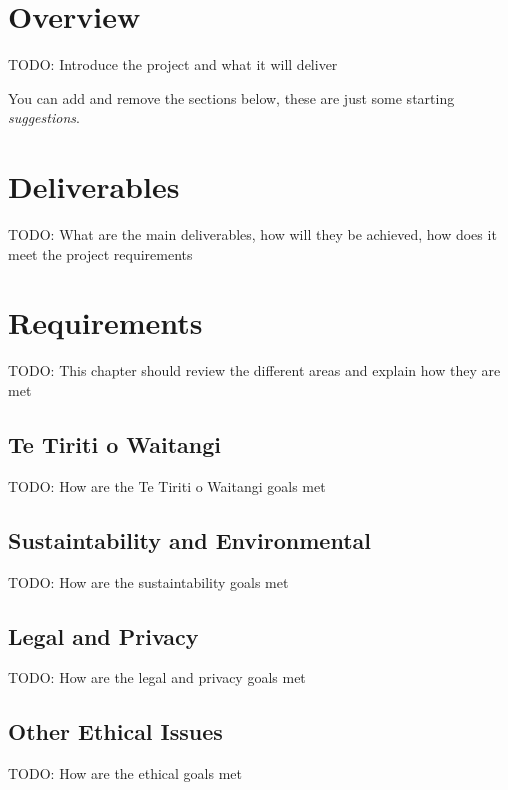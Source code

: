 
\chapter{Overview}

TODO: Introduce the project and what it will deliver

You can add and remove the sections below, these are just some starting \textit{suggestions}.

\chapter{Deliverables}

TODO: What are the main deliverables, how will they be achieved, how does it meet the project requirements

\chapter{Requirements}

TODO: This chapter should review the different areas and explain how they are met

\section{Te Tiriti o Waitangi}

TODO: How are the Te Tiriti o Waitangi goals met

\section{Sustaintability and Environmental}

TODO: How are the sustaintability goals met

\section{Legal and Privacy}

TODO: How are the legal and privacy goals met

\section{Other Ethical Issues}

TODO: How are the ethical goals met

